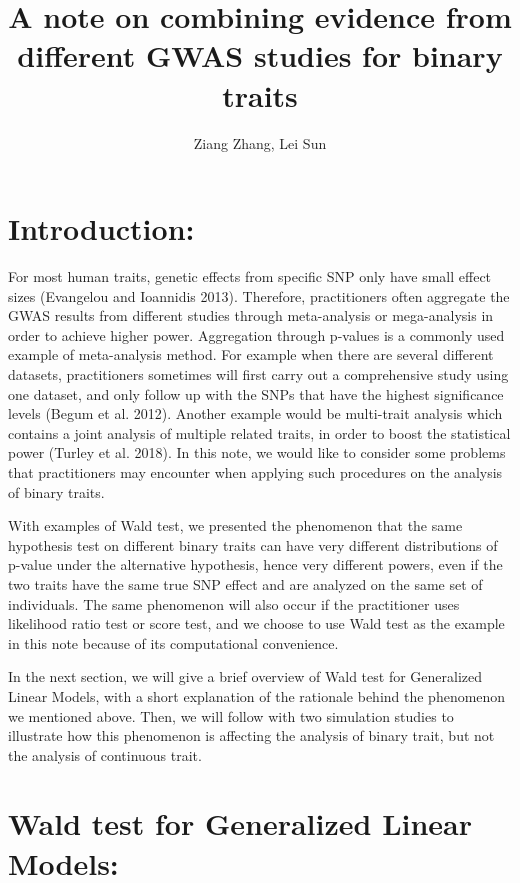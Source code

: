 \documentclass[
]{article}
\title{\textbf{A note on combining evidence from different GWAS studies
for binary traits}}
\author{Ziang Zhang, Lei Sun}
\date{}
\begin{document}
\maketitle

\newcommand{\p}{\text{P}}
\newcommand{\E}{\mathbb{E}}
\newcommand{\Var}{\text{Var}}

\hypertarget{introduction}{%
\section{Introduction:}\label{introduction}}

For most human traits, genetic effects from specific SNP only have small
effect sizes (Evangelou and Ioannidis 2013). Therefore, practitioners
often aggregate the GWAS results from different studies through
meta-analysis or mega-analysis in order to achieve higher power.
Aggregation through p-values is a commonly used example of meta-analysis
method. For example when there are several different datasets,
practitioners sometimes will first carry out a comprehensive study using
one dataset, and only follow up with the SNPs that have the highest
significance levels (Begum et al. 2012). Another example would be
multi-trait analysis which contains a joint analysis of multiple related
traits, in order to boost the statistical power (Turley et al. 2018). In
this note, we would like to consider some problems that practitioners
may encounter when applying such procedures on the analysis of binary
traits.

With examples of Wald test, we presented the phenomenon that the same
hypothesis test on different binary traits can have very different
distributions of p-value under the alternative hypothesis, hence very
different powers, even if the two traits have the same true SNP effect
and are analyzed on the same set of individuals. The same phenomenon
will also occur if the practitioner uses likelihood ratio test or score
test, and we choose to use Wald test as the example in this note because
of its computational convenience.

In the next section, we will give a brief overview of Wald test for
Generalized Linear Models, with a short explanation of the rationale
behind the phenomenon we mentioned above. Then, we will follow with two
simulation studies to illustrate how this phenomenon is affecting the
analysis of binary trait, but not the analysis of continuous trait.

\hypertarget{wald-test-for-generalized-linear-models}{%
\section{Wald test for Generalized Linear
Models:}\label{wald-test-for-generalized-linear-models}}
\end{document}
